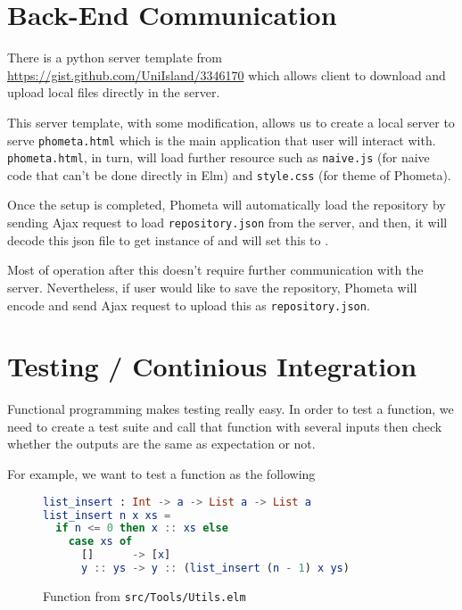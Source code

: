 \documentclass[master.tex]{subfiles}
\begin{document}
\section{Back-End Communication}
There is a python server template from
\url{https://gist.github.com/UniIsland/3346170} which allows client to
download and upload local files directly in the server.

This server template, with some modification, allows us to create a local server
to serve \texttt{phometa.html} which is the main application that user will
interact with. \texttt{phometa.html}, in turn, will load further resource such
as \texttt{naive.js} (for naive code that can't be done directly in Elm) and
\texttt{style.css} (for theme of Phometa).

Once the setup is completed, Phometa will automatically load the repository by
sending Ajax request to load \texttt{repository.json} from the server, and then,
it will decode this json file to get instance of  and will set
this to .

Most of operation after this doesn't require further communication with the
server. Nevertheless, if user would like to save the repository, Phometa will
encode  and send Ajax request to upload this as
\texttt{repository.json}.

\section{Testing / Continious Integration}
Functional programming makes testing really easy. In order to test a function,
we need to create a test suite and call that function with several inputs then
check whether the outputs are the same as expectation or not.

For example, we want to test a function  as the following

\begin{figure}[H]
\begin{framed}
\begin{lstlisting}[language=elm]
list_insert : Int -> a -> List a -> List a
list_insert n x xs =
  if n <= 0 then x :: xs else
    case xs of
      []      -> [x]
      y :: ys -> y :: (list_insert (n - 1) x ys)
\end{lstlisting}
\end{framed}
\caption{Function  from \texttt{src/Tools/Utils.elm}}
\label{fig:implementation-test-src}
\end{figure}
\end{document}
